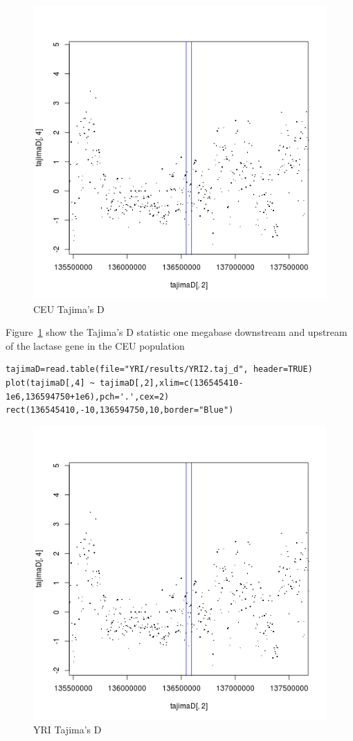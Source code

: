 \documentclass[a4paper,10pt]{article}
\begin{document}
\begin{figure}
\centering
\includegraphics{pictures/CEUtajimas.png}
\caption{CEU Tajima's D}
\label{fig:tajceu}
\end{figure}

Figure~\ref{fig:tajceu} show the Tajima's D statistic one megabase downstream and upstream of the lactase gene in the CEU population

\begin{verbatim}
tajimaD=read.table(file="YRI/results/YRI2.taj_d", header=TRUE)
plot(tajimaD[,4] ~ tajimaD[,2],xlim=c(136545410-1e6,136594750+1e6),pch='.',cex=2)
rect(136545410,-10,136594750,10,border="Blue") 
\end{verbatim}

\begin{figure}
\centering
\includegraphics{pictures/CEUtajimas.png}
\caption{YRI Tajima's D}
\label{fig:tajyri}
\end{figure}
\end{document}

